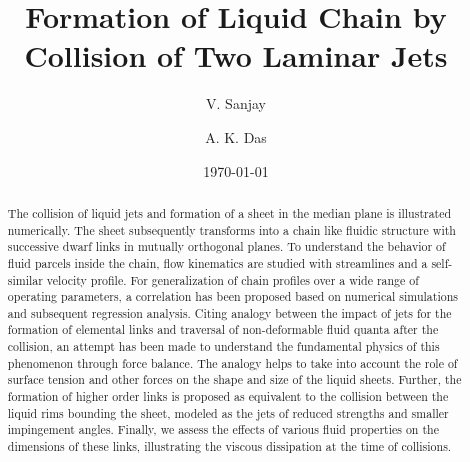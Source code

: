 \documentclass[%
 aip,
 sd,%
amsmath,amssymb,
preprint,%
author-year,%
]{revtex4-1}
\begin{document}
\newcommand{\MarkerCircleRed}{\raisebox{0.5pt}{\tikz{\node[draw,scale=0.4,circle,fill=red!100!red](){};}}}
\newcommand{\MarkerSquareRed}{\raisebox{0.5pt}{\tikz{\node[draw,scale=0.4,regular polygon, regular polygon sides=4,fill=black!20!red](){};}}}
\newcommand{\MarkerDiamondBlack}{\raisebox{0pt}{\tikz{\node[draw,scale=0.4,diamond,fill=black!100!](){};}}}
\newcommand{\MarkerSquareEmpty}{\raisebox{0pt}{\tikz{\node[draw,scale=0.4,regular polygon, regular polygon sides=4](){};}}}
\newcommand{\MarkerCircleEmpty}{\raisebox{0pt}{\tikz{\node[draw,scale=0.4,circle](){};}}}
\title[]{{\color{red}Formation} of Liquid Chain by Collision of Two Laminar Jets}
\author{V. Sanjay}
\author{A. K. Das}
%
\date{\today}

\begin{abstract}
The collision of liquid jets and formation of a sheet in the median plane is illustrated numerically. The sheet subsequently transforms into a chain like fluidic structure with successive dwarf links in mutually orthogonal planes. To understand the behavior of fluid parcels inside the chain, flow kinematics are studied with streamlines and a self-similar velocity profile. For generalization of chain profiles over a wide range of operating parameters, a correlation has been proposed based on numerical simulations and subsequent regression analysis. Citing analogy between the impact of jets for the formation of elemental links and traversal of non-deformable fluid quanta after the collision, an attempt has been made to understand the fundamental physics of this phenomenon through force balance. The analogy helps to take into account the role of surface tension and other forces on the shape and size of the liquid sheets. Further, the formation of higher order links is proposed as equivalent to the collision between the liquid rims bounding the sheet, modeled as the jets of reduced strengths and smaller impingement angles. Finally, we assess the effects of various fluid properties on the dimensions of these links, illustrating the viscous dissipation at the time of collisions.  
\end{abstract}
\maketitle
\end{document}
